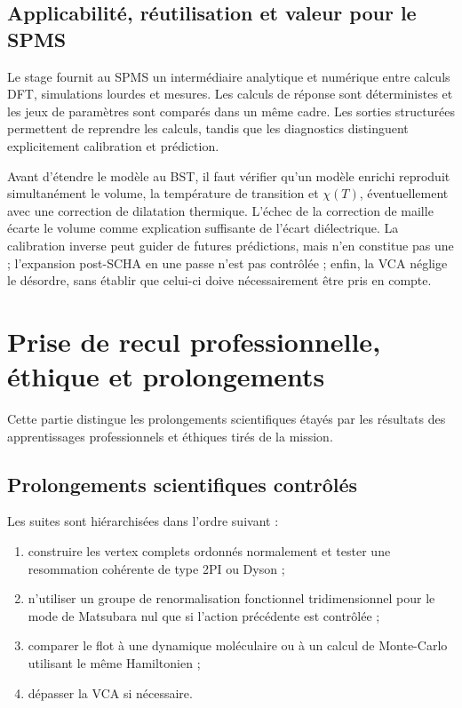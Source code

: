 \documentclass{rapportCS}
\begin{document}
\subsection*{Applicabilité, réutilisation et valeur pour le SPMS}

Le stage fournit au SPMS un intermédiaire analytique et numérique entre calculs
DFT, simulations lourdes et mesures. Les calculs de réponse sont déterministes
et les jeux de paramètres sont comparés dans un même cadre. Les sorties
structurées permettent de reprendre les calculs, tandis que les diagnostics
distinguent explicitement calibration et prédiction.

Avant d'étendre le modèle au BST, il faut vérifier qu'un modèle enrichi reproduit
simultanément le volume, la température de transition et $\chi(T)$,
éventuellement avec une correction de dilatation thermique. L'échec de la
correction de maille écarte le volume comme explication suffisante de l'écart
diélectrique. La calibration inverse peut guider de futures prédictions, mais
n'en constitue pas une ; l'expansion post-SCHA en une passe n'est pas contrôlée ;
enfin, la VCA néglige le désordre, sans établir que celui-ci doive nécessairement
être pris en compte.




\section{Prise de recul professionnelle, éthique et prolongements}
\label{sec:professional_perspective}

Cette partie distingue les prolongements scientifiques étayés par les résultats
des apprentissages professionnels et éthiques tirés de la mission.

\subsection{Prolongements scientifiques contrôlés}

Les suites sont hiérarchisées dans l'ordre suivant :

\begin{enumerate}
  \item construire les vertex complets ordonnés normalement et tester une
  resommation cohérente de type 2PI ou Dyson ;
  \item n'utiliser un groupe de renormalisation fonctionnel tridimensionnel pour
  le mode de Matsubara nul que si l'action précédente est contrôlée ;
  \item comparer le flot à une dynamique moléculaire ou à un calcul de
  Monte-Carlo utilisant le même Hamiltonien ;
  \item dépasser la VCA si nécessaire.
\end{enumerate}
\end{document}
